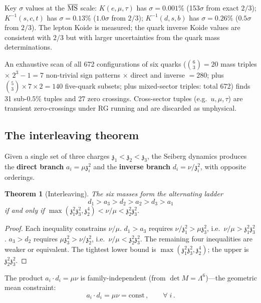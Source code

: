 \documentclass[aps,prd,twocolumn,showpacs,preprintnumbers,superscriptaddress,floatfix]{revtex4-2}
\newtheorem{theorem}{Theorem}
\newcommand{\zch}{\mathfrak{z}}
\begin{document}
Key $\sigma$ values at the $\overline{\rm MS}$ scale:
$K(e,\mu,\tau)$ has $\sigma = 0.001\%$ (153$\sigma$ from exact
$2/3$);
$K^{-1}(s,c,t)$ has $\sigma = 0.13\%$ ($1.0\sigma$ from $2/3$);
$K^{-1}(d,s,b)$ has $\sigma = 0.26\%$ ($0.5\sigma$ from $2/3$).
The lepton Koide is measured; the quark inverse Koide values are
consistent with $2/3$ but with larger uncertainties from the
quark mass determinations.

An exhaustive scan of all 672 configurations of six quarks
($\binom{6}{3} = 20$ mass triples $\times$ $2^3 - 1 = 7$
non-trivial sign patterns $\times$ direct and inverse $= 280$;
plus $\binom{5}{3} \times 7 \times 2 = 140$ five-quark subsets;
plus mixed-sector triples: total 672)
finds 31 sub-$0.5\%$ tuples and 27 zero crossings.
Cross-sector tuples (e.g.\ $u, \mu, \tau$) are transient
zero-crossings under RG running and are discarded as
unphysical.


\subsection{The interleaving theorem}

Given a single set of three charges $\zch_1 < \zch_2 < \zch_3$,
the Seiberg dynamics produces the \textbf{direct branch}
$a_i = \mu\zch_i^2$ and the \textbf{inverse branch}
$d_i = \nu/\zch_i^2$, with opposite orderings.

\begin{theorem}[Interleaving]
\label{thm:interleave}
The six masses form the alternating ladder
\begin{equation}
  d_1 > a_3 > d_2 > a_2 > d_3 > a_1
\end{equation}
if and only if
$\max(\zch_1^2\zch_3^2, \zch_2^4) < \nu/\mu
< \zch_2^2\zch_3^2$.
\end{theorem}

\begin{proof}
Each inequality constrains $\nu/\mu$.
$d_1 > a_3$ requires $\nu/\zch_1^2 > \mu\zch_3^2$,
i.e.\ $\nu/\mu > \zch_1^2\zch_3^2$.
$a_3 > d_2$ requires $\mu\zch_3^2 > \nu/\zch_2^2$,
i.e.\ $\nu/\mu < \zch_2^2\zch_3^2$.
The remaining four inequalities are weaker or equivalent.
The tightest lower bound is
$\max(\zch_1^2\zch_3^2, \zch_2^4)$; the upper is
$\zch_2^2\zch_3^2$.
\end{proof}

The product $a_i \cdot d_i = \mu\nu$ is family-independent
(from $\det M = \Lambda^6$)---the geometric mean constraint:
\begin{equation}
  a_i \cdot d_i = \mu\nu = \text{const}\,,
  \qquad\forall\; i\,.
  \label{eq:productrule}
\end{equation}
\end{document}
